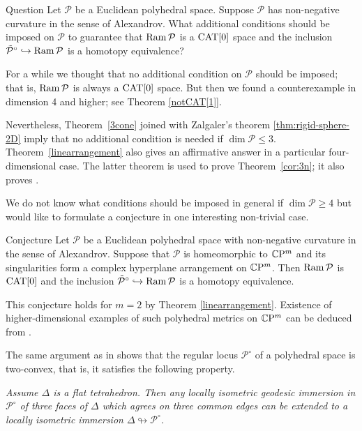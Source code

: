 \documentclass[oneside,a4paper]{article}
\begin{document}
\begin{thm}{Question}\label{quest:generalized}
Let $\mathcal{P}$ be a Euclidean polyhedral space. Suppose $\mathcal{P}$ has non-negative curvature in the sense of Alexandrov.
What additional conditions should be imposed on $\mathcal{P}$  to guarantee that $\mathop{\rm Ram}\nolimits \mathcal{P}$ is a $\mathrm{CAT}[0]$ space
and the inclusion $\tilde{\mathcal{P}}^\circ\hookrightarrow\mathop{\rm Ram}\nolimits \mathcal{P}$ is a homotopy equivalence?
\end{thm}


For a while we thought that no additional condition on $\mathcal{P}$ should be imposed;
that is, $\mathop{\rm Ram}\nolimits \mathcal{P}$ is always a $\mathrm{CAT}[0]$ space.  
But then we found a counterexample in dimension 4 and higher;
see Theorem \ref{notCAT[1]}.

Nevertheless, Theorem~\ref{3cone} joined with Zalgaler's theorem \ref{thm:rigid-sphere-2D}
imply that no additional condition is needed if $\dim \mathcal{P}\le 3$.
Theorem~\ref{linearrangement} also gives an affirmative answer in a particular four-dimensional case.
The latter theorem is used to prove Theorem~\ref{cor:3n};
it also proves \cite[Conjecture 8.2]{panov}.

We do not know what conditions should be imposed in general if $\dim \mathcal{P}\ge 4$
but would like to formulate a conjecture in one interesting non-trivial case.

\begin{thm}{Conjecture} \label{planearrangement1} Let $\mathcal{P}$ be a Euclidean polyhedral space with non-negative curvature in the sense of Alexandrov.
Suppose  that $\mathcal{P}$ is homeomorphic to $\mathbb{C}\mathrm{P}^m$ and its singularities form a complex hyperplane arrangement on $\mathbb{C}\mathrm{P}^m$. 
Then $\mathop{\rm Ram}\nolimits \mathcal{P}$ is  $\mathrm{CAT}[0]$ 
and the inclusion $\tilde{\mathcal{P}}^\circ\hookrightarrow\mathop{\rm Ram}\nolimits \mathcal{P}$ is a homotopy equivalence.
\end{thm}

This conjecture holds for $m=2$ by Theorem \ref{linearrangement}. 
Existence of higher-dimensional examples 
of such polyhedral metrics on $\mathbb{C}\mathrm{P}^m$ can be deduced from 
\cite{looijenga}.

The same argument as in \cite{panov-petrunin} shows that the regular locus $\mathcal{P}^\circ$ of a polyhedral space is two-convex,
that is, it satisfies the following property.

\emph{Assume $\Delta$ is a flat tetrahedron.
Then any locally isometric geodesic immersion in  $\mathcal{P}^\circ$
of three faces of $\Delta$ which agrees on three common edges  can be extended to a
locally isometric immersion $\Delta\looparrowright \mathcal{P}^\circ$.}
\end{document}
